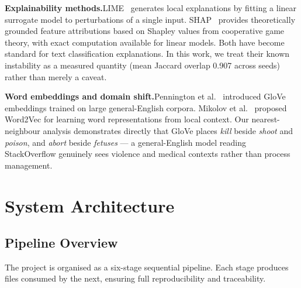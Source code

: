 \documentclass[11pt,a4paper]{article}
\begin{document}
\textbf{Explainability methods.}\quad LIME~\cite{ribeiro2016why} generates local explanations by fitting a linear surrogate model to perturbations of a single input. SHAP~\cite{lundberg2017unified} provides theoretically grounded feature attributions based on Shapley values from cooperative game theory, with exact computation available for linear models. Both have become standard for text classification explanations. In this work, we treat their known instability as a measured quantity (mean Jaccard overlap 0.907 across seeds) rather than merely a caveat.

\textbf{Word embeddings and domain shift.}\quad Pennington et al.~\cite{pennington2014glove} introduced GloVe embeddings trained on large general-English corpora. Mikolov et al.~\cite{mikolov2013distributed} proposed Word2Vec for learning word representations from local context. Our nearest-neighbour analysis demonstrates directly that GloVe places \textit{kill} beside \textit{shoot} and \textit{poison}, and \textit{abort} beside \textit{fetuses} --- a general-English model reading StackOverflow genuinely sees violence and medical contexts rather than process management.

\section{System Architecture}

\subsection{Pipeline Overview}

The project is organised as a six-stage sequential pipeline. Each stage produces files consumed by the next, ensuring full reproducibility and traceability.
\end{document}
